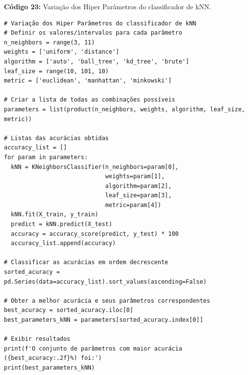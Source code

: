 \documentclass[a4paper,12pt]{article} %
\begin{document}
\begin{center}
\textbf{Código 23:} Variação dos Hiper Parâmetros do classificador de kNN.
\begin{verbatim}
# Variação dos Hiper Parâmetros do classificador de kNN
# Definir os valores/intervalos para cada parâmetro
n_neighbors = range(3, 11)
weights = ['uniform', 'distance']
algorithm = ['auto', 'ball_tree', 'kd_tree', 'brute']
leaf_size = range(10, 101, 10)
metric = ['euclidean', 'manhattan', 'minkowski']

# Criar a lista de todas as combinações possíveis
parameters = list(product(n_neighbors, weights, algorithm, leaf_size, metric))

# Listas das acurácias obtidas
accuracy_list = []
for param in parameters:
  kNN = KNeighborsClassifier(n_neighbors=param[0],
                             weights=param[1],
                             algorithm=param[2],
                             leaf_size=param[3],
                             metric=param[4])
  kNN.fit(X_train, y_train)
  predict = kNN.predict(X_test)
  accuracy = accuracy_score(predict, y_test) * 100
  accuracy_list.append(accuracy)

# Classificar as acurácias em ordem decrescente
sorted_acuracy = pd.Series(data=accuracy_list).sort_values(ascending=False)

# Obter a melhor acurácia e seus parâmetros correspondentes
best_acuracy = sorted_acuracy.iloc[0]
best_parameters_kNN = parameters[sorted_acuracy.index[0]]

# Exibir resultados
print(f'O conjunto de parâmetros com maior acurácia ({best_acuracy:.2f}%) foi:')
print(best_parameters_kNN)
\end{verbatim}
\end{center}
\end{document}
